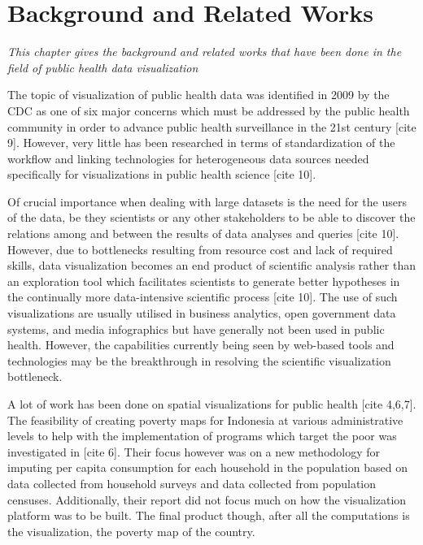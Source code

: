 \chapter{Background and Related Works}\label{chap2}
\textit{This chapter gives the background and related works that have been done in the field of public health data visualization}

\vfill
\minitoc
\newpage
\renewcommand{\baselinestretch}{1.80}\normalsize
The topic of visualization of public health data was identified in 2009 by the CDC as one of six major concerns which must be addressed by the public health community in order to advance public health surveillance in the 21st century [cite 9]. However, very little has been researched in terms of standardization of the workflow and linking technologies for heterogeneous data sources needed specifically for visualizations in public health science [cite 10].

Of crucial importance when dealing with large datasets is the need for the users of the data, be they scientists or any other stakeholders to be able to discover the relations among and between the results of data analyses and queries [cite 10]. However, due to bottlenecks resulting from resource cost and lack of required skills, data visualization becomes an end product of scientific analysis rather than an exploration tool which facilitates scientists to generate better hypotheses in the continually more data-intensive scientific process [cite 10]. The use of such visualizations are usually utilised in business analytics, open government data systems, and media infographics but have generally not been used in public health. However, the capabilities currently being seen by web-based tools and technologies may be the breakthrough in resolving the scientific visualization bottleneck.

A lot of work has been done on spatial visualizations for public health [cite 4,6,7].  The feasibility of creating poverty maps for Indonesia at various administrative levels to help with the implementation of programs which target the poor was investigated in [cite 6]. Their focus however was on a new methodology for imputing per capita consumption for each household in the population based on data collected from household surveys and data collected from population censuses. Additionally, their report did not focus much on how the visualization platform was to be built. The final product though, after all the computations is the visualization, the poverty map of the country.  

